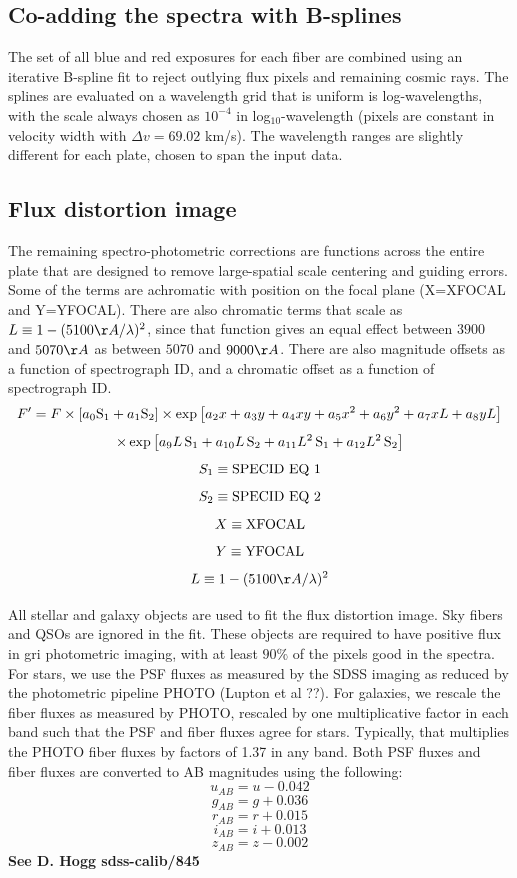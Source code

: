 \documentclass[12pt,preprint]{aastex}
\begin{document}
\subsection{Co-adding the spectra with B-splines}

The set of all blue and red exposures for each fiber are
combined using an iterative B-spline fit to reject outlying flux pixels
and remaining cosmic rays.
The splines are evaluated on a wavelength grid that
is uniform is log-wavelengths, with the scale always chosen
as $10^{-4}$ in log$_{10}$-wavelength (pixels are constant in 
velocity width with $\Delta v = 69.02$ km/s).  The wavelength ranges are
slightly different for each plate, chosen to span the input data.

\subsection{Flux distortion image}

The remaining spectro-photometric corrections are functions across
the entire plate that are designed to remove large-spatial scale centering
and guiding errors.
Some of the terms are achromatic with position on the focal plane
(X=XFOCAL and Y=YFOCAL).  There are also chromatic terms that scale
as $ L \equiv 1 - (5100\AA / \lambda)^2 $, since that function gives
an equal effect between $3900$ and $5070\AA$ as between $5070$
and $9000\AA$.
There are also magnitude offsets as a function of spectrograph ID,
and a chromatic offset as a function of spectrograph ID.
$$ F' =  F  \times \left[ a_0 {\rm S_1} + a_1 {\rm S_2} \right]
 \times \exp \left[ a_2 x + a_3 y + a_4 xy + a_5 x^2 + a_6 y^2  + a_7 xL + a_8 yL \right] $$
$$  \times \exp \left[ a_9 L \, {\rm S_1} + a_{10} L \, {\rm S_2}
  + a_{11} L^2 \, {\rm S_1} + a_{12} L^2 \, {\rm S_2} \right]  $$
$$ S_1 \equiv {\rm SPECID~EQ~1} $$
$$ S_2 \equiv {\rm SPECID~EQ~2} $$
$$ X \equiv {\rm XFOCAL} $$
$$ Y \equiv {\rm YFOCAL} $$
$$ L \equiv 1 - (5100\AA / \lambda)^2 $$

All stellar and galaxy objects are used to fit the flux distortion
image.  Sky fibers and QSOs are ignored in the fit.
These objects are required to have positive flux in gri photometric imaging,
with at least $90\%$ of the pixels good in the spectra.
For stars, we use the PSF fluxes as measured by
the SDSS imaging as reduced by the photometric pipeline PHOTO 
(Lupton et al ??).
For galaxies, we rescale the fiber fluxes as measured by PHOTO,
rescaled by one multiplicative factor in each band such that the
PSF and fiber fluxes agree for stars.  Typically, that multiplies
the PHOTO fiber fluxes by factors of 1.37 in any band.
Both PSF fluxes and fiber fluxes are converted to AB magnitudes
using the following:
$$ u_{AB} = u - 0.042 $$
$$ g_{AB} = g + 0.036 $$
$$ r_{AB} = r + 0.015 $$
$$ i_{AB} = i + 0.013 $$
$$ z_{AB} = z - 0.002 $$
{\bf See D. Hogg sdss-calib/845}
\end{document}
